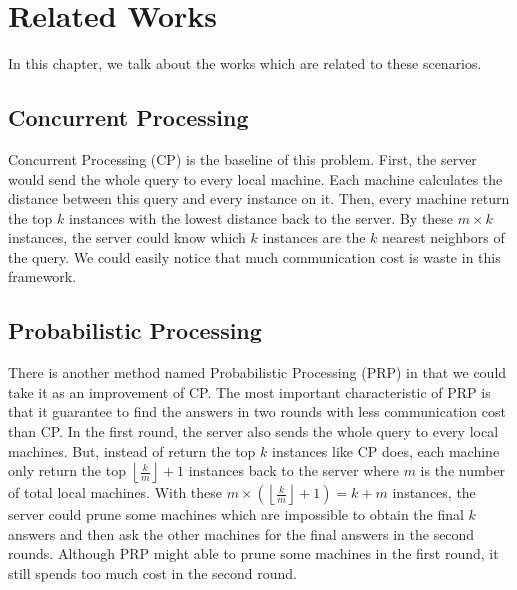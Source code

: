 \chapter{Related Works}
\label{c:related}

In this chapter, we talk about the works which are related to these scenarios. \\

\section{Concurrent Processing} %
\label{s:concurrent_processing}
Concurrent Processing (CP) \cite{PRP} is the baseline of this problem.  First, the server would send the whole query to every local machine.  Each machine calculates the distance between this query and every instance on it.  Then, every machine return the top $k$ instances with the lowest distance back to the server.  By these $m\times k$ instances, the server could know which $k$ instances are the $k$ nearest neighbors of the query.  We could easily notice that much communication cost is waste in this framework.

\section{Probabilistic Processing} %
\label{s:probabilistic_processing}
\providecommand{\myfloor}[1]{\left \lfloor #1 \right \rfloor }
There is another method named Probabilistic Processing (PRP) in \cite{PRP} that we could take it as an improvement of CP. The most important characteristic of PRP is that it guarantee to find the answers in two rounds with less communication cost than CP.  In the first round, the server also sends the whole query to every local machines.  But, instead of return the top $k$ instances like CP does, each machine only return the top $\myfloor{\frac{k}{m}}+1$ instances back to the server where $m$ is the number of total local machines.  With these $m \times(\myfloor{\frac{k}{m}}+1)=k+m$ instances, the server could prune some machines which are impossible to obtain the final $k$ answers and then ask the other machines for the final answers in the second rounds.  Although PRP might able to prune some machines in the first round, it still spends too much cost in the second round.


